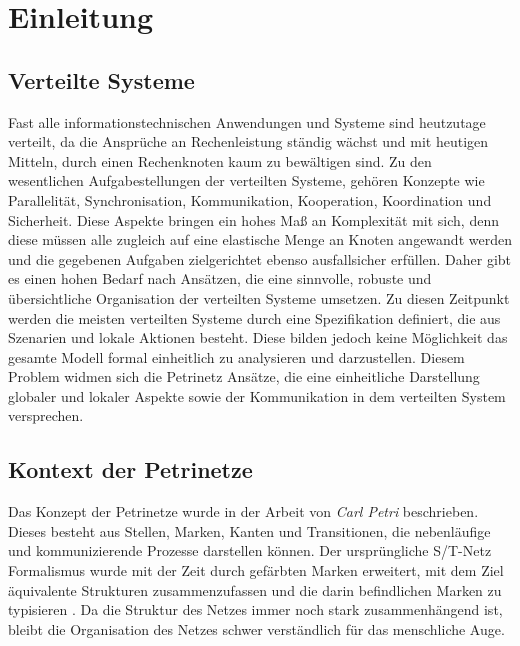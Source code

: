 \chapter{Einleitung}

\section{Verteilte Systeme}

	Fast alle informationstechnischen Anwendungen und Systeme sind heutzutage verteilt, da die Ansprüche an Rechenleistung ständig wächst und mit heutigen Mitteln, durch einen Rechenknoten kaum zu bewältigen sind. \bigbreak
	Zu den wesentlichen Aufgabestellungen der verteilten Systeme, gehören Konzepte wie Parallelität, Synchronisation, Kommunikation, Kooperation, Koordination und Sicherheit. Diese Aspekte bringen ein hohes Maß an Komplexität mit sich, denn diese müssen alle zugleich auf eine elastische Menge an Knoten angewandt werden und die gegebenen Aufgaben zielgerichtet ebenso ausfallsicher erfüllen. Daher gibt es einen hohen Bedarf nach Ansätzen, die eine sinnvolle, robuste und übersichtliche Organisation der verteilten Systeme umsetzen. \bigbreak
	Zu diesen Zeitpunkt werden die meisten verteilten Systeme durch eine Spezifikation definiert, die aus Szenarien und lokale Aktionen besteht. Diese bilden jedoch keine Möglichkeit das gesamte Modell formal einheitlich zu analysieren und darzustellen. Diesem Problem widmen sich die Petrinetz Ansätze, die eine einheitliche Darstellung globaler und lokaler Aspekte sowie der Kommunikation in dem verteilten System versprechen. \cite{ochsenschlager2013modellierung}

\section{Kontext der Petrinetze} \label{sec:KdP} 

	Das Konzept der Petrinetze wurde in der Arbeit von \textit{Carl Petri} beschrieben. Dieses besteht aus Stellen, Marken, Kanten und Transitionen, die nebenläufige und kommunizierende Prozesse darstellen können. Der ursprüngliche S/T-Netz Formalismus wurde mit der Zeit durch gefärbten Marken erweitert, mit dem Ziel äquivalente Strukturen zusammenzufassen und die darin befindlichen Marken zu typisieren \cite{kummerReferenznetze}. Da die Struktur des Netzes immer noch stark zusammenhängend ist, bleibt die Organisation des Netzes schwer verständlich für das menschliche Auge.\bigbreak

